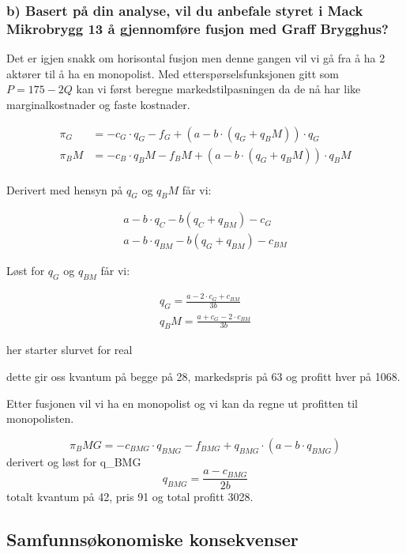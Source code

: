 \documentclass[
  12pt,
  a4paper,
  DIV=11,
  numbers=noendperiod]{scrartcl}
\begin{document}
\subsubsection{b) Basert på din analyse, vil du anbefale styret i Mack
Mikrobrygg 13 å gjennomføre fusjon med Graff
Brygghus?}\label{b-basert-puxe5-din-analyse-vil-du-anbefale-styret-i-mack-mikrobrygg-13-uxe5-gjennomfuxf8re-fusjon-med-graff-brygghus}

Det er igjen snakk om horisontal fusjon men denne gangen vil vi gå fra å
ha 2 aktører til å ha en monopolist. Med etterspørselsfunksjonen gitt
som \(P=175-2Q\) kan vi først beregne markedstilpasningen da de nå har
like marginalkostnader og faste kostnader.

\begin{align*}
\pi_G &= -c_G\cdot q_G - f_G + (a-b\cdot(q_G+q_BM))\cdot q_G \\
\pi_BM &= -c_B\cdot q_BM - f_BM + (a-b\cdot(q_G+q_BM))\cdot q_BM \\
\end{align*}

Derivert med hensyn på \(q_G\) og \(q_BM\) får vi:

\begin{align*}
a-b\cdot q_C - b(q_C + q_{BM})- c_G \\
a-b\cdot q_{BM} - b(q_G + q_{BM})- c_{BM} 
\end{align*}

Løst for \(q_G\) og \(q_{BM}\) får vi:

\begin{align*}
q_G = \frac{a-2\cdot c_G +c_{BM}}{3b} \\
q_BM = \frac{a +c_G - 2\cdot c_{BM}}{3b}
\end{align*}

her starter slurvet for real

dette gir oss kvantum på begge på 28, markedspris på 63 og profitt hver
på 1068.

Etter fusjonen vil vi ha en monopolist og vi kan da regne ut profitten
til monopolisten.

\[
\pi_BMG = -c_{BMG}\cdot q_{BMG} - f_{BMG} + q_{BMG}\cdot (a-b\cdot q_{BMG})
\] derivert og løst for q\_BMG \[
q_{BMG} = \frac{a-c_{BMG}}{2b}
\] totalt kvantum på 42, pris 91 og total profitt 3028.

\clearpage

\subsection{Samfunnsøkonomiske
konsekvenser}\label{samfunnsuxf8konomiske-konsekvenser}
\end{document}
